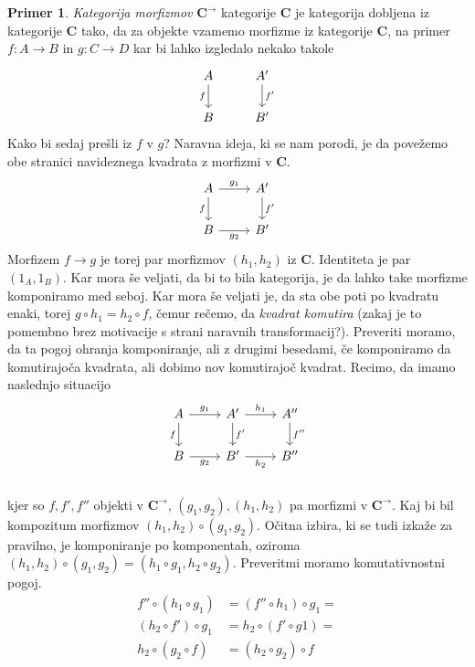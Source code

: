 \documentclass[12pt,a4paper]{book}
\theoremstyle{definition}
\theoremstyle{plain}
\theoremstyle{definition}
\newtheorem{primer}{Primer}[section]
\theoremstyle{remark}
\newcommand{\cat}[1]{\textbf{#1}}
\begin{document}
\begin{primer}
\textit{Kategorija morfizmov} $\cat{C}^{\rightarrow}$ kategorije $\cat{C}$ je kategorija dobljena iz kategorije $\cat{C}$ tako, da za objekte vzamemo morfizme iz kategorije $\cat{C}$, na primer $f : A \to B$ in $g : C \to D$ kar bi lahko izgledalo nekako takole
\[ \begin{tikzcd}
A \arrow[d, "f"'] & A' \arrow[d, "f'"] \\
B & B'
\end{tikzcd} \]
Kako bi sedaj prešli iz $f$ v $g$? Naravna ideja, ki se nam porodi, je da povežemo obe stranici navideznega kvadrata z morfizmi v $\cat{C}$.
\[ \begin{tikzcd}
A \arrow[d, "f"'] \arrow[r, "g_1"] & A' \arrow[d, "f'"] \\
B \arrow[r, "g_2"'] & B'
\end{tikzcd} \]
Morfizem $f \to g$ je torej par morfizmov $(h_1, h_2)$ iz $\cat{C}$.
Identiteta je par $(1_A, 1_B)$.
Kar mora še veljati, da bi to bila kategorija, je da lahko take morfizme komponiramo med seboj. Kar mora še veljati je, da sta obe poti po kvadratu enaki, torej $g \circ h_1 = h_2 \circ f$, čemur rečemo, da \textit{kvadrat komutira} (zakaj je to pomembno brez motivacije s strani naravnih transformacij?). Preveriti moramo, da ta pogoj ohranja komponiranje, ali z drugimi besedami, če komponiramo da komutirajoča kvadrata, ali dobimo nov komutirajoč kvadrat.
Recimo, da imamo naslednjo situacijo
%
$$\begin{tikzcd}
A \arrow[d, "f"'] \arrow[r, "g_1"] & A' \arrow[d, "f'"] \arrow[r, "h_1"] & A'' \arrow[d, "f''"] \\
B \arrow[r, "g_2"'] & B' \arrow[r, "h_2"'] & B'' \\
\end{tikzcd}$$
%
kjer so $f, f', f''$ objekti v $\cat{C}^{\rightarrow}$, $(g_1, g_2), (h_1,h_2)$ pa morfizmi v $\cat{C}^{\rightarrow}$. Kaj bi bil kompozitum morfizmov $(h_1,h_2) \circ (g_1,g_2)$. Očitna izbira, ki se tudi izkaže za pravilno, je komponiranje po komponentah, oziroma $(h_1,h_2) \circ (g_1,g_2) = (h_1 \circ g_1, h_2 \circ g_2)$. Preveritmi moramo komutativnostni pogoj. 
\begin{align*}
f'' \circ (h_1 \circ g_1) &= (f'' \circ h_1) \circ g_1 = \\
(h_2 \circ f') \circ g_1 &= h_2 \circ (f' \circ g1) = \\
h_2 \circ (g_2 \circ f) &= (h_2 \circ g_2) \circ f
\end{align*}

\end{primer}
\end{document}
